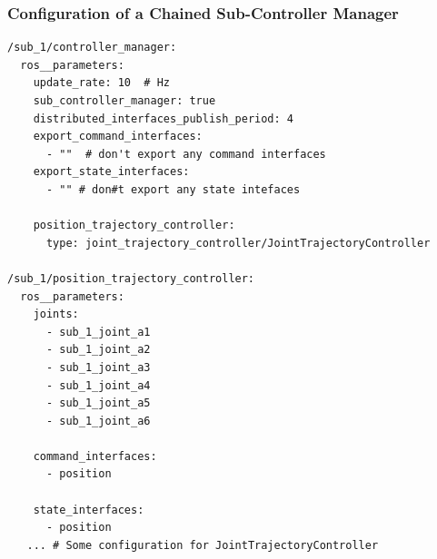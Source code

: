 \subsubsection{Configuration of a Chained Sub-Controller Manager}
\lstset{language=yaml,basicstyle=\scriptsize}
\begin{lstlisting}[caption=Example configuration of a chained sub-controller manager.,label=c5_l_chained_sub_controller_manager_config]
/sub_1/controller_manager:
  ros__parameters:
    update_rate: 10  # Hz
    sub_controller_manager: true
    distributed_interfaces_publish_period: 4
    export_command_interfaces:
      - ""  # don't export any command interfaces
    export_state_interfaces:
      - "" # don#t export any state intefaces

    position_trajectory_controller:
      type: joint_trajectory_controller/JointTrajectoryController

/sub_1/position_trajectory_controller:
  ros__parameters:
    joints:
      - sub_1_joint_a1
      - sub_1_joint_a2
      - sub_1_joint_a3
      - sub_1_joint_a4
      - sub_1_joint_a5
      - sub_1_joint_a6

    command_interfaces:
      - position

    state_interfaces:
      - position
   ... # Some configuration for JointTrajectoryController 
\end{lstlisting}